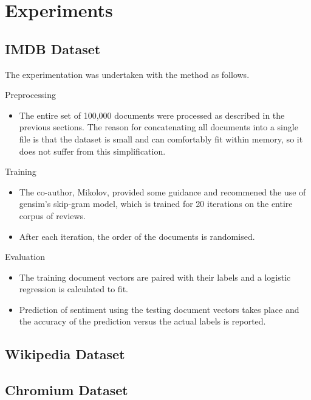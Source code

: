 \documentclass[11pt]{article}
\begin{document}
\section*{Experiments}

\subsection*{IMDB Dataset}
The experimentation was undertaken with the method as follows. 

\renewcommand\labelitemi{{\boldmath$\cdot$}}
\begin{description}
  \item Preprocessing
    \begin{itemize}
      \item The entire set of 100,000 documents were processed as described in the previous sections.
      The reason for concatenating all documents into a single file is that the dataset is small and can comfortably fit within memory, so it does not suffer from this simplification.
    \end{itemize}
  \item Training
    \begin{itemize}
      \item The co-author, Mikolov, provided some guidance and recommened the use of gensim's skip-gram model, which is trained for 20 iterations on the entire corpus of reviews.
      \item After each iteration, the order of the documents is randomised.
    \end{itemize}
  \item Evaluation
    \begin{itemize}
      \item The training document vectors are paired with their labels and a logistic regression is calculated to fit.
      \item Prediction of sentiment using the testing document vectors takes place and the accuracy of the prediction versus the actual labels is reported.
    \end{itemize}
\end{description}


\subsection*{Wikipedia Dataset}

\subsection*{Chromium Dataset}
\end{document}
